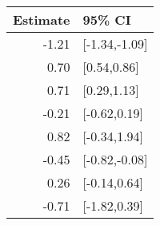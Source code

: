 \begin{tabular}{rl}
  \hline
Estimate & 95\% CI \\ 
  \hline
-1.21 & [-1.34,-1.09] \\ 
  0.70 & [0.54,0.86] \\ 
  0.71 & [0.29,1.13] \\ 
  -0.21 & [-0.62,0.19] \\ 
  0.82 & [-0.34,1.94] \\ 
  -0.45 & [-0.82,-0.08] \\ 
  0.26 & [-0.14,0.64] \\ 
  -0.71 & [-1.82,0.39] \\ 
   \hline
\end{tabular}

